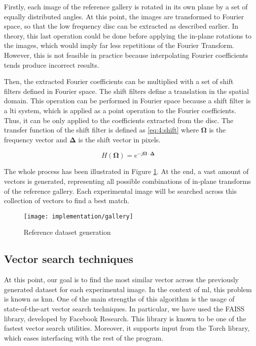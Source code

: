 \documentclass[../main.tex]{subfiles}
\begin{document}
Firstly, each image of the reference gallery is rotated in its own plane by a set of equally distributed angles. At this point, the images are transformed to Fourier space, so that the low frequency disc can be extracted as described earlier. In theory, this last operation could be done before applying the in-plane rotations to the images, which would imply far less repetitions of the Fourier Transform. However, this is not feasible in practice because interpolating Fourier coefficients tends produce incorrect results.

Then, the extracted Fourier coefficients can be multiplied with a set of shift filters defined in Fourier space. The shift filters define a translation in the spatial domain. This operation can be performed in Fourier space because a shift filter is a \gls{lti} system, which is applied as a point operation to the Fourier coefficients. Thus, it can be only applied to the coefficients extracted from the disc. The transfer function of the shift filter is defined as \eqref{eq:4:shift} where $\bm{\Omega}$ is the frequency vector and $\bm{\Delta}$ is the shift vector in pixels.

\begin{equation}\label{eq:4:shift}
    H(\bm{\Omega}) = e^{-j\bm{\Omega} \cdot \bm{\Delta}}
\end{equation}

The whole process has been illustrated in Figure \ref{fig:4:reference}. At the end, a vast amount of vectors is generated, representing all possible combinations of in-plane transforms of the reference gallery. Each experimental image will be searched across this collection of vectors to find a best match.

\begin{figure}[htbp]
    \centering
    \texttt{[image: implementation/gallery]}
    \caption{Reference dataset generation}
    \label{fig:4:reference}
\end{figure}

\subsection{Vector search techniques}
At this point, our goal is to find the most similar vector across the previously generated dataset for each experimental image. In the context of \gls{ml}, this problem is known as \gls{knn}. One of the main strengths of this algorithm is the usage of state-of-the-art vector search techniques. In particular, we have used the FAISS library\cite{johnson2019}, developed by Facebook Research. This library is known to be one of the fastest vector search utilities. Moreover, it supports input from the Torch library, which eases interfacing with the rest of the program.
\end{document}
